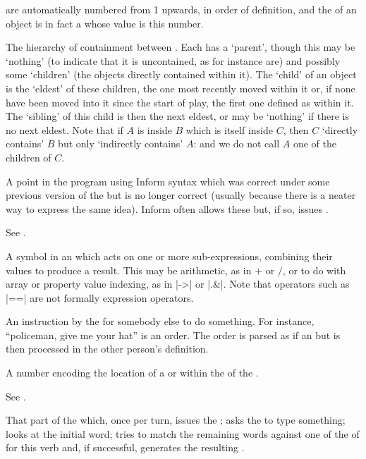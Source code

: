 {{{%
 are automatically numbered from 1 upwards, in order of
definition, and the  of an object is in fact a 
whose value is this number.

%
The hierarchy of containment between .  Each has a `parent',
though this may be `nothing' (to indicate that it is uncontained, as for
instance  are) and possibly some `children' (the objects directly
contained within it).  The `child' of an object is the `eldest' of these
children, the one most recently moved within it or, if none have been moved
into it since the start of play, the first one defined as within it.  The
`sibling' of this child is then the next eldest, or may be `nothing' if
there is no next eldest.  Note that if $A$ is inside $B$ which is itself
inside $C$, then $C$ `directly contains' $B$ but only `indirectly
contains' $A$: and we do not call $A$ one of the children of $C$.

%
A point in the program using Inform syntax which was correct under some
previous version of the  but is no longer correct (usually
because there is a neater way to express the same idea).  Inform often
allows these but, if so, issues .

%
See .

%
A symbol in an  which acts on one or more sub-expressions,
combining their values to produce a result.  This may be arithmetic, as
in $+$ or $/$, or to do with array or property value indexing, as in
|->| or |.&|.  Note that  operators such as |==| are not
formally expression operators.

%
An instruction by the  for somebody else to do something.  For
instance, ``policeman, give me your hat'' is an order.  The order is
parsed as if an  but is then processed in the other person's
 definition.

%
A number encoding the location of a  or  within
the  of the .

%
See .

%
That part of the  which, once per turn, issues the ;
asks the  to type something; looks at the initial  word; tries
to match the remaining words against one of the  of  for
this verb and, if successful, generates the resulting .

}}}
